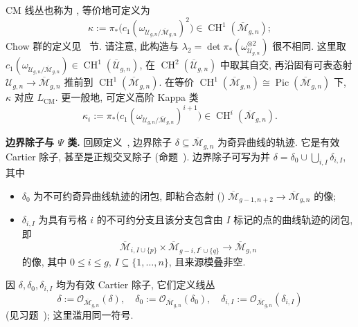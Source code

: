 \begin{remark}[Kappa 类]\label{src:6.10.5}
CM 线丛也称为 , 等价地可定义为
\[
\kappa:=\pi_*\bigl(c_1(\omega_{\mathcal U_{g,n}/\overline{\mathcal M}_{g,n}})^2\bigr)\in\operatorname{CH}^1(\overline{\mathcal M}_{g,n});
\]
Chow 群的定义见~ 节. 请注意, 此构造与 $\lambda_2=\det\pi_*(\omega_{\mathcal U_{g,\allowbreak n}}^{\otimes2})$ 很不相同. 这里取 $c_1(\omega_{\mathcal U_{g,\allowbreak n}/\overline{\mathcal M}_{g,\allowbreak n}})\in\operatorname{CH}^1(\overline{\mathcal U}_{g,\allowbreak n})$, 在 $\operatorname{CH}^2(\overline{\mathcal U}_{g,\allowbreak n})$ 中取其自交, 再沿固有可表态射 $\mathcal U_{g,\allowbreak n}\to\overline{\mathcal M}_{g,\allowbreak n}$ 推前到 $\operatorname{CH}^1(\overline{\mathcal M}_{g,\allowbreak n})$. 在等价 $\operatorname{CH}^1(\overline{\mathcal M}_{g,\allowbreak n})\cong\operatorname{Pic}(\overline{\mathcal M}_{g,\allowbreak n})$ 下, $\kappa$ 对应 $L_{\mathrm{CM}}$. 更一般地, 可定义高阶 Kappa 类
\[
\kappa_i:=\pi_*\bigl(c_1(\omega_{\mathcal U_{g,n}/\overline{\mathcal M}_{g,n}})^{i+1}\bigr)\in\operatorname{CH}^i(\overline{\mathcal M}_{g,n}).
\]
\end{remark}
\noindent\textbf{边界除子与 $\Psi$ 类.} 回顾定义~, 边界除子 $\delta\subseteq\overline{\mathcal M}_{g,\allowbreak n}$ 为奇异曲线的轨迹. 它是有效 Cartier 除子, 甚至是正规交叉除子 (命题~). 边界除子可写为并 $\delta=\delta_0\cup\bigcup_{i,\allowbreak I}\delta_{i,\allowbreak I}$, 其中
\begin{itemize}
\item $\delta_0$ 为不可约奇异曲线轨迹的闭包, 即粘合态射 () $\overline{\mathcal M}_{g-1,\allowbreak n+2}\to\overline{\mathcal M}_{g,\allowbreak n}$ 的像;
\item $\delta_{i,\allowbreak I}$ 为具有亏格 $i$ 的不可约分支且该分支包含由 $I$ 标记的点的曲线轨迹的闭包, 即
\[
\overline{\mathcal M}_{i,I\cup\{p\}}\times\overline{\mathcal M}_{g-i,I^c\cup\{q\}}\longrightarrow\overline{\mathcal M}_{g,n}
\]
的像, 其中 $0\leq i\leq g$, $I\subseteq\{1,\allowbreak \ldots,\allowbreak n\}$, 且来源模叠非空.
\end{itemize}
因 $\delta,\allowbreak \delta_0,\allowbreak \delta_{i,\allowbreak I}$ 均为有效 Cartier 除子, 它们定义线丛
\[
\delta:=\mathcal O_{\overline{\mathcal M}_{g,n}}(\delta),\quad
\delta_0:=\mathcal O_{\overline{\mathcal M}_{g,n}}(\delta_0),\quad
\delta_{i,I}:=\mathcal O_{\overline{\mathcal M}_{g,n}}(\delta_{i,I})
\]
(见习题~); 这里滥用同一符号.
\newpage
